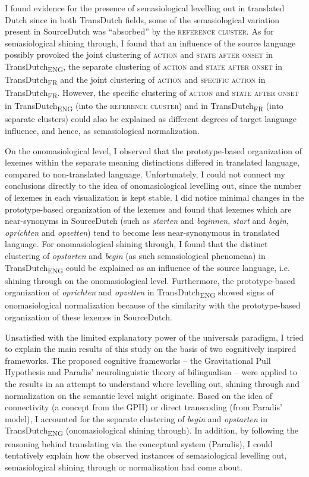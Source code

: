 I found evidence for the presence of semasiological levelling out in translated Dutch since in both TransDutch fields, some of the semasiological variation present in SourceDutch was ``absorbed'' by the \textsc{reference cluster}. As for semasiological shining through, I found that an influence of the source language possibly provoked the joint clustering of \textsc{action} and \textsc{state after onset} in TransDutch\textsubscript{ENG}, the separate clustering of \textsc{action} and \textsc{state after onset} in TransDutch\textsubscript{FR} and the joint clustering of \textsc{action} and {\textsc{specific}} \textsc{action} in TransDutch\textsubscript{FR}. However, the specific clustering of \textsc{action} and \textsc{state after onset} in TransDutch\textsubscript{ENG} (into the \textsc{reference cluster}) and in TransDutch\textsubscript{FR} (into separate clusters) could also be explained as different degrees of target language influence, and hence, as semasiological normalization.

On the onomasiological level, I observed that the prototype-based organization of lexemes within the separate meaning distinctions differed in translated language, compared to non-translated language. Unfortunately, I could not connect my conclusions directly to the idea of onomasiological levelling out, since the number of lexemes in each visualization is kept stable. I did notice minimal changes in the prototype-based organization of the lexemes and found that lexemes which are near-synonyms in SourceDutch (such as \textit{starten} and \textit{beginnen}, \textit{start} and \textit{begin}, \textit{oprichten} and \textit{opzetten}) tend to become less near-synonymous in translated language. For onomasiological shining through, I found that the distinct clustering of \textit{opstarten} and \textit{begin} (as such semasiological phenomena) in TransDutch\textsubscript{ENG} could be explained as an influence of the source language, i.e. shining through on the onomasiological level. Furthermore, the prototype-based organization of \textit{oprichten} and \textit{opzetten} in TransDutch\textsubscript{ENG} showed signs of onomasiological normalization because of the similarity with the prototype-based organization of these lexemes in SourceDutch.

Unsatisfied with the limited explanatory power of the universals paradigm, I tried to explain the main results of this study on the basis of two cognitively inspired frameworks. The proposed cognitive frameworks – the Gravitational Pull Hypothesis and Paradis’ neurolinguistic theory of bilingualism – were applied to the results in an attempt to understand where levelling out, shining through and normalization on the semantic level might originate. Based on the idea of connectivity (a concept from the GPH) or direct transcoding (from Paradis’ model), I accounted for the separate clustering of \textit{begin} and \textit{opstarten} in TransDutch\textsubscript{ENG} (onomasiological shining through). In addition, by following the reasoning behind translating via the conceptual system (Paradis), I could tentatively explain how the observed instances of semasiological levelling out, semasiological shining through or normalization had come about.

